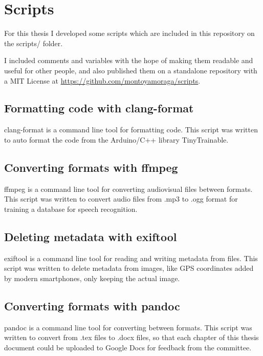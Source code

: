 \chapter{Scripts}

For this thesis I developed some scripts which are included in this repository on the  scripts/ folder.

I included comments and variables with the hope of making them readable and useful for other people, and also published them on a standalone repository with a MIT License at \url{https://github.com/montoyamoraga/scripts}.

\section{Formatting code with clang-format}

clang-format is a command line tool for formatting code. This script was written to auto format the code from the Arduino/C++ library TinyTrainable.



\section{Converting formats with ffmpeg}

ffmpeg is a command line tool for converting audiovisual files between formats. This script was written to convert audio files from .mp3 to .ogg format for training a database for speech recognition.



\section{Deleting metadata with exiftool}

exiftool is a command line tool for reading and writing metadata from files. This script was written to delete metadata from images, like GPS coordinates added by modern smartphones, only keeping the actual image.



\section{Converting formats with pandoc}

pandoc is a command line tool for converting between formats. This script was written to convert from .tex files to .docx files, so that each chapter of this thesis document could be uploaded to Google Docs for feedback from the committee.


